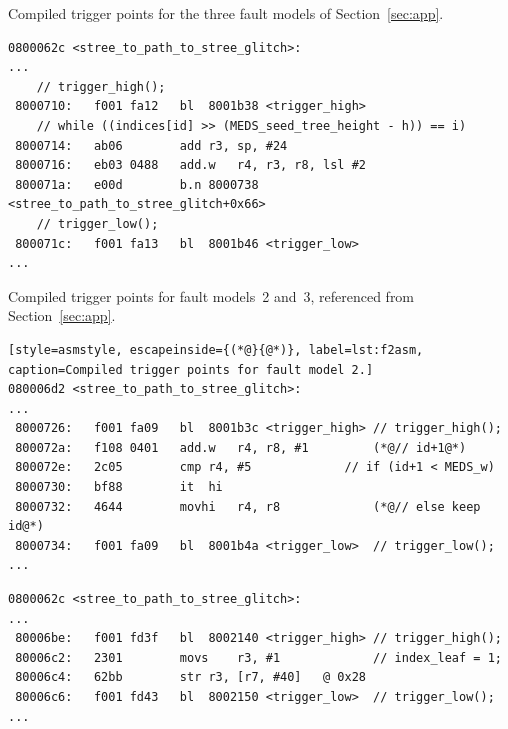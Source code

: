 Compiled trigger points for the three fault models of Section~\ref{sec:app}.

\begin{lstlisting}[style=asmstyle, label=lst:f1asm, caption=Compiled trigger points for fault model 1.]
0800062c <stree_to_path_to_stree_glitch>:
...
    // trigger_high();
 8000710:	f001 fa12 	bl	8001b38 <trigger_high>
    // while ((indices[id] >> (MEDS_seed_tree_height - h)) == i)
 8000714:	ab06      	add	r3, sp, #24
 8000716:	eb03 0488 	add.w	r4, r3, r8, lsl #2
 800071a:	e00d      	b.n	8000738 <stree_to_path_to_stree_glitch+0x66>
    // trigger_low();
 800071c:	f001 fa13 	bl	8001b46 <trigger_low>
...
\end{lstlisting}

Compiled trigger points for fault models~2 and~3, referenced from
Section~\ref{sec:app}.

\begin{lstlisting}[style=asmstyle, escapeinside={(*@}{@*)}, label=lst:f2asm, caption=Compiled trigger points for fault model 2.]
080006d2 <stree_to_path_to_stree_glitch>:
...
 8000726:	f001 fa09 	bl	8001b3c <trigger_high> // trigger_high();
 800072a:	f108 0401 	add.w	r4, r8, #1         (*@// id+1@*)
 800072e:	2c05      	cmp	r4, #5             // if (id+1 < MEDS_w)
 8000730:	bf88      	it	hi
 8000732:	4644      	movhi	r4, r8             (*@// else keep id@*)
 8000734:	f001 fa09 	bl	8001b4a <trigger_low>  // trigger_low();
...
\end{lstlisting}

\begin{lstlisting}[style=asmstyle, label=lst:f3asm, caption=Compiled trigger points for fault model 3.]
0800062c <stree_to_path_to_stree_glitch>:
...
 80006be:	f001 fd3f 	bl	8002140 <trigger_high> // trigger_high();
 80006c2:	2301      	movs	r3, #1             // index_leaf = 1;
 80006c4:	62bb      	str	r3, [r7, #40]	@ 0x28
 80006c6:	f001 fd43 	bl	8002150 <trigger_low>  // trigger_low();
...
\end{lstlisting}

